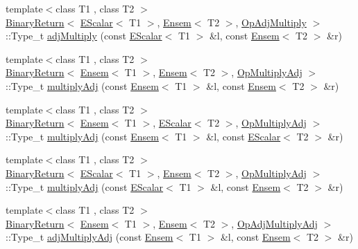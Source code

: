\begin{DoxyCompactItemize}
\item 
{\footnotesize template$<$class T1 , class T2 $>$ }\\\mbox{\hyperlink{structENSEM_1_1BinaryReturn}{Binary\+Return}}$<$ \mbox{\hyperlink{classENSEM_1_1EScalar}{E\+Scalar}}$<$ T1 $>$, \mbox{\hyperlink{classENSEM_1_1Ensem}{Ensem}}$<$ T2 $>$, \mbox{\hyperlink{structENSEM_1_1OpAdjMultiply}{Op\+Adj\+Multiply}} $>$\+::Type\+\_\+t \mbox{\hyperlink{group__eensem_ga6ec27b863a98d9cf552c2a0194dc53f5}{adj\+Multiply}} (const \mbox{\hyperlink{classENSEM_1_1EScalar}{E\+Scalar}}$<$ T1 $>$ \&l, const \mbox{\hyperlink{classENSEM_1_1Ensem}{Ensem}}$<$ T2 $>$ \&r)
\item 
{\footnotesize template$<$class T1 , class T2 $>$ }\\\mbox{\hyperlink{structENSEM_1_1BinaryReturn}{Binary\+Return}}$<$ \mbox{\hyperlink{classENSEM_1_1Ensem}{Ensem}}$<$ T1 $>$, \mbox{\hyperlink{classENSEM_1_1Ensem}{Ensem}}$<$ T2 $>$, \mbox{\hyperlink{structENSEM_1_1OpMultiplyAdj}{Op\+Multiply\+Adj}} $>$\+::Type\+\_\+t \mbox{\hyperlink{group__eensem_gae49707140467f24b7b7a50fad851d99a}{multiply\+Adj}} (const \mbox{\hyperlink{classENSEM_1_1Ensem}{Ensem}}$<$ T1 $>$ \&l, const \mbox{\hyperlink{classENSEM_1_1Ensem}{Ensem}}$<$ T2 $>$ \&r)
\item 
{\footnotesize template$<$class T1 , class T2 $>$ }\\\mbox{\hyperlink{structENSEM_1_1BinaryReturn}{Binary\+Return}}$<$ \mbox{\hyperlink{classENSEM_1_1Ensem}{Ensem}}$<$ T1 $>$, \mbox{\hyperlink{classENSEM_1_1EScalar}{E\+Scalar}}$<$ T2 $>$, \mbox{\hyperlink{structENSEM_1_1OpMultiplyAdj}{Op\+Multiply\+Adj}} $>$\+::Type\+\_\+t \mbox{\hyperlink{group__eensem_ga8ab2ff96201bb49703846d6eb968fd11}{multiply\+Adj}} (const \mbox{\hyperlink{classENSEM_1_1Ensem}{Ensem}}$<$ T1 $>$ \&l, const \mbox{\hyperlink{classENSEM_1_1EScalar}{E\+Scalar}}$<$ T2 $>$ \&r)
\item 
{\footnotesize template$<$class T1 , class T2 $>$ }\\\mbox{\hyperlink{structENSEM_1_1BinaryReturn}{Binary\+Return}}$<$ \mbox{\hyperlink{classENSEM_1_1EScalar}{E\+Scalar}}$<$ T1 $>$, \mbox{\hyperlink{classENSEM_1_1Ensem}{Ensem}}$<$ T2 $>$, \mbox{\hyperlink{structENSEM_1_1OpMultiplyAdj}{Op\+Multiply\+Adj}} $>$\+::Type\+\_\+t \mbox{\hyperlink{group__eensem_ga54febfeb3d62a5f905b336fb99d89805}{multiply\+Adj}} (const \mbox{\hyperlink{classENSEM_1_1EScalar}{E\+Scalar}}$<$ T1 $>$ \&l, const \mbox{\hyperlink{classENSEM_1_1Ensem}{Ensem}}$<$ T2 $>$ \&r)
\item 
{\footnotesize template$<$class T1 , class T2 $>$ }\\\mbox{\hyperlink{structENSEM_1_1BinaryReturn}{Binary\+Return}}$<$ \mbox{\hyperlink{classENSEM_1_1Ensem}{Ensem}}$<$ T1 $>$, \mbox{\hyperlink{classENSEM_1_1Ensem}{Ensem}}$<$ T2 $>$, \mbox{\hyperlink{structENSEM_1_1OpAdjMultiplyAdj}{Op\+Adj\+Multiply\+Adj}} $>$\+::Type\+\_\+t \mbox{\hyperlink{group__eensem_gaf92e62b8e69b299d4f4193702fb8dab3}{adj\+Multiply\+Adj}} (const \mbox{\hyperlink{classENSEM_1_1Ensem}{Ensem}}$<$ T1 $>$ \&l, const \mbox{\hyperlink{classENSEM_1_1Ensem}{Ensem}}$<$ T2 $>$ \&r)

\end{DoxyCompactItemize}
